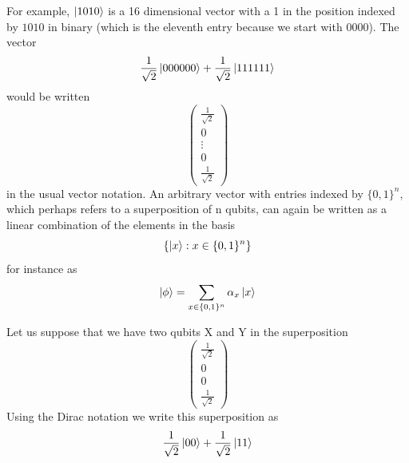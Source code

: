 For example, $\ket{1010}$ is a 16 dimensional vector with a 1 in the position indexed by $1010$ in binary (which is the eleventh entry because we start with 0000). The vector
\[
\frac{1}{\sqrt{2}} \ket{000000} +\frac{1}{\sqrt{2}}\ket{111111}
\]
would be written
\[
\begin{pmatrix} \frac{1}{\sqrt{2}} \\ 0 \\ \vdots \\ 0 \\\frac{1}{\sqrt{2}} \end{pmatrix}
\]
in the usual vector notation. An arbitrary vector with entries indexed by $\{0,1\}^n$, which perhaps refers to a superposition of n qubits, can again be written as a linear combination of the elements in the basis
\[
\{\ket{x}:x \in \{0,1\}^n\}
\]
for instance as
\[
\ket{\phi}=\sum_{x\in\{0,1\}^n} \alpha_x \ket{x}
\]

\begin{example}
    Let us suppose that we have two qubits X and Y in the superposition
    \[
    \begin{pmatrix} \frac{1}{\sqrt{2}} \\ 0 \\ 0 \\ \frac{1}{\sqrt{2}} \end{pmatrix}
    \]
    Using the Dirac notation we write this superposition as
    \[
    \frac{1}{\sqrt{2}}\ket{00}+\frac{1}{\sqrt{2}}\ket{11}
    \]
\end{example}


